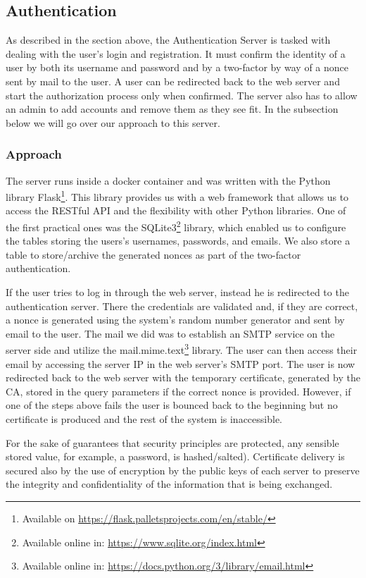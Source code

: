 \documentclass[10pt]{article}
\begin{document}
\subsection{Authentication}

As described in the section above, the Authentication Server is tasked with dealing with the user's login and registration. It must confirm the identity of a user by both its username and password and by a two-factor by way of a nonce sent by mail to the user. A user can be redirected back to the web server and start the authorization process only when confirmed. The server also has to allow an admin to add accounts and remove them as they see fit. In the subsection below we will go over our approach to this server.

\subsubsection{Approach}

The server runs inside a docker container and was written with the Python library Flask\footnote{Available on \url{https://flask.palletsprojects.com/en/stable/}}. This library provides us with a web framework that allows us to access the RESTful API and the flexibility with other Python libraries. One of the first practical ones was the SQLite3\footnote{Available online in: \url{https://www.sqlite.org/index.html}} library, which enabled us to configure the tables storing the users's usernames, passwords, and emails. We also store a table to store/archive the generated nonces as part of the two-factor authentication.

If the user tries to log in through the web server, instead he is redirected to the authentication server. There the credentials are validated and, if they are correct, a nonce is generated using the system's random number generator and sent by email to the user. The mail we did was to establish an SMTP service on the server side and utilize the mail.mime.text\footnote{Available online in: \url{https://docs.python.org/3/library/email.html}} library. The user can then access their email by accessing the server IP in the web server's SMTP port. The user is now redirected back to the web server with the temporary certificate, generated by the CA, stored in the query parameters if the correct nonce is provided. However, if one of the steps above fails the user is bounced back to the beginning but no certificate is produced and the rest of the system is inaccessible.

For the sake of guarantees that security principles are protected, any sensible stored value, for example, a password, is hashed/salted). Certificate delivery is secured also by the use of encryption by the public keys of each server to preserve the integrity and confidentiality of the information that is being exchanged.
\end{document}
